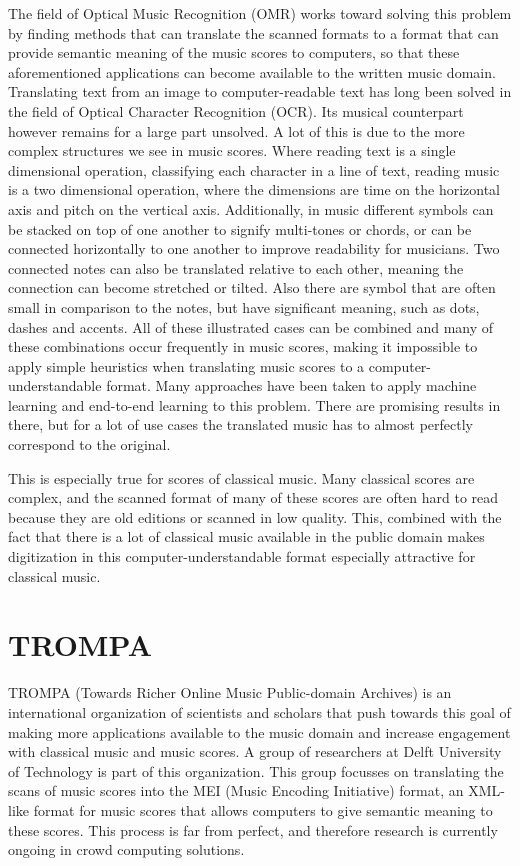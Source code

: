 The field of Optical Music Recognition (OMR) works toward solving this problem by finding methods that can translate the scanned formats to a format that can provide semantic meaning of the music scores to computers, so that these aforementioned applications can become available to the written music domain. Translating text from an image to computer-readable text has long been solved in the field of Optical Character Recognition (OCR)\citeneeded. Its musical counterpart however remains for a large part unsolved. A lot of this is due to the more complex structures we see in music scores. Where reading text is a single dimensional operation, classifying each character in a line of text, reading music is a two dimensional operation, where the dimensions are time on the horizontal axis and pitch on the vertical axis. Additionally, in music different symbols can be stacked on top of one another to signify multi-tones or chords, or can be connected horizontally to one another to improve readability for musicians. Two connected notes can also be translated relative to each other, meaning the connection can become stretched or tilted. Also there are symbol that are often small in comparison to the notes, but have significant meaning, such as dots, dashes and accents.  All of these illustrated cases can be combined and many of these combinations occur frequently in music scores, making it impossible to apply simple heuristics when translating music scores to a computer-understandable format. Many approaches have been taken to apply machine learning and end-to-end learning \citeneeded to this problem. There are promising results in there, but for a lot of use cases the translated music has to almost perfectly correspond to the original. 

This is especially true for scores of classical music. Many classical scores are complex, and the scanned format of many of these scores are often hard to read because they are old editions or scanned in low quality. This, combined with the fact that there is a lot of classical music available in the public domain makes digitization in this computer-understandable format especially attractive for classical music.

\section{TROMPA}\label{sec:introduction-TROMPA}
TROMPA (Towards Richer Online Music Public-domain Archives) is an international organization of scientists and scholars that push towards this goal of making more applications available to the music domain and increase engagement with classical music and music scores\citeneeded {}. A group of researchers at Delft University of Technology is part of this organization. This group focusses on translating the scans of music scores into the MEI (Music Encoding Initiative) format, an XML-like format for music scores that allows computers to give semantic meaning to these scores\citeneeded. This process is far from perfect, and therefore research is currently ongoing in crowd computing solutions.

